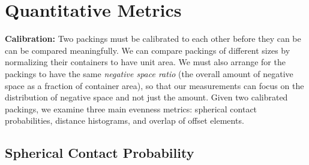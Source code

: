 \section{Quantitative Metrics}


\textbf{Calibration:}
Two packings must be calibrated to each other before they can be
can be compared meaningfully.  
We can compare packings of different sizes by normalizing their containers to
have unit area.  We must also arrange for the packings to have the same
\textit{negative space ratio} 
(the overall amount of negative space as a 
fraction of container area), so that our measurements can focus on the
distribution of negative space and not just the amount.  Given two
calibrated packings, we examine three main evenness metrics:
spherical contact probabilities,
distance histograms,
and overlap of offset elements. 


\subsection{Spherical Contact Probability}

